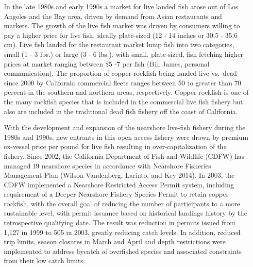 \documentclass[11pt,
  english,
  a4paper,
]{article}
\begin{document}
In the late 1980s and early 1990s a market for live landed fish arose out of Los Angeles and the Bay area, driven by demand from Asian restaurants and markets. The growth of the live fish market was driven by consumers willing to pay a higher price for live fish, ideally plate-sized (12 - 14 inches or 30.5 - 35.6 cm). Live fish landed for the restaurant market lump fish into two categories, small (1 - 3 lbs.) or large (3 - 6 lbs.), with small, plate-sized, fish fetching higher prices at market ranging between \$5 -7 per fish (Bill James, personal communication). The proportion of copper rockfish being landed live vs.~dead since 2000 by California commercial fleets ranges between 50 to greater than 70 percent in the southern and northern areas, respectively. Copper rockfish is one of the many rockfish species that is included in the commercial live fish fishery but also are included in the traditional dead fish fishery off the coast of California.

\leavevmode\tagmcend\tagstructend\par


With the development and expansion of the nearshore live-fish fishery during the 1980s and 1990s, new entrants in this open access fishery were drawn by premium ex-vessel price per pound for live fish resulting in over-capitalization of the fishery. Since 2002, the California Department of Fish and Wildlife (CDFW) has managed 19 nearshore species in accordance with Nearshore Fisheries Management Plan {(Wilson-Vandenberg, Larinto, and Key 2014)\leavevmode\tagmcend\tagstructend}. In 2003, the CDFW implemented a Nearshore Restricted Access Permit system, including requirement of a Deeper Nearshore Fishery Species Permit to retain copper rockfish, with the overall goal of reducing the number of participants to a more sustainable level, with permit issuance based on historical landings history by the retrospective qualifying date. The result was reduction in permits issued from 1,127 in 1999 to 505 in 2003, greatly reducing catch levels. In addition, reduced trip limits, season closures in March and April and depth restrictions were implemented to address bycatch of overfished species and associated constraints from their low catch limits.

\leavevmode\tagmcend\tagstructend\par

\end{document}
